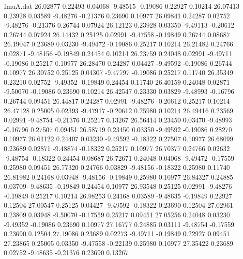 \begin{filecontents}{ImuA.dat}
  26.02877    0.22493    0.04068   -9.48515   -0.19086    0.22927    0.10214
  26.07413    0.23928    0.03589   -9.48276   -0.21376    0.23690    0.10977
  26.09841    0.24287    0.02752   -9.48276   -0.21376    0.26744    0.07924
  26.12123    0.23928    0.03350   -9.49113   -0.20612    0.26744    0.07924
  26.14432    0.25125    0.02991   -9.47558   -0.19849    0.26744    0.08687
  26.19047    0.23689    0.03230   -9.49472   -0.19086    0.25217    0.10214
  26.21482    0.24766    0.02871   -9.48156   -0.19849    0.24454    0.10214
  26.23759    0.24048    0.02991   -9.49711   -0.19086    0.25217    0.10977
  26.28470    0.24287    0.04427   -9.49592   -0.19086    0.26744    0.10977
  26.30752    0.25125    0.04307   -9.47797   -0.19086    0.25217    0.11740
  26.35349    0.23210    0.02752   -9.49352   -0.19849    0.24454    0.11740
  26.40159    0.24048    0.02871   -9.50070   -0.19086    0.23690    0.10214
  26.42547    0.23330    0.03829   -9.48993   -0.16796    0.26744    0.09451
  26.44817    0.24287    0.02991   -9.48276   -0.20612    0.25217    0.10214
  26.47128    0.25005    0.02393   -9.47917   -0.20612    0.25980    0.10214
  26.49416    0.23569    0.02991   -9.48754   -0.21376    0.25217    0.13267
  26.56414    0.23450    0.03470   -9.48993   -0.16796    0.27507    0.09451
  26.58719    0.23450    0.03350   -9.49592   -0.19086    0.28270    0.10977
  26.61122    0.24407    0.03230   -9.49592   -0.18322    0.27507    0.10977
  26.68099    0.23689    0.02871   -9.48874   -0.18322    0.25217    0.10977
  26.70377    0.24766    0.02632   -9.48754   -0.18322    0.24454    0.08687
  26.72671    0.24048    0.04068   -9.49472   -0.17559    0.25980    0.09451
  26.77320    0.24766    0.03829   -9.48156   -0.18322    0.25980    0.11740
  26.81982    0.24168    0.03948   -9.48156   -0.19849    0.25980    0.10977
  26.84327    0.24885    0.03709   -9.48635   -0.19849    0.24454    0.10977
  26.93548    0.25125    0.02991   -9.48276   -0.19849    0.25217    0.10214
  26.98253    0.24168    0.03589   -9.48635   -0.19849    0.22927    0.12504
  27.00547    0.25125    0.04427   -9.49592   -0.18322    0.23690    0.12504
  27.02961    0.23809    0.03948   -9.50070   -0.17559    0.25217    0.09451
  27.05256    0.24048    0.03230   -9.49352   -0.19086    0.23690    0.10977
  27.16777    0.24885    0.03111   -9.48754   -0.17559    0.23690    0.12504
  27.19086    0.23689    0.02273   -9.49711   -0.19849    0.22927    0.09451
  27.23865    0.25005    0.03350   -9.47558   -0.22139    0.25980    0.10977
  27.35422    0.23689    0.02752   -9.48635   -0.21376    0.23690    0.13267

\end{filecontents}
